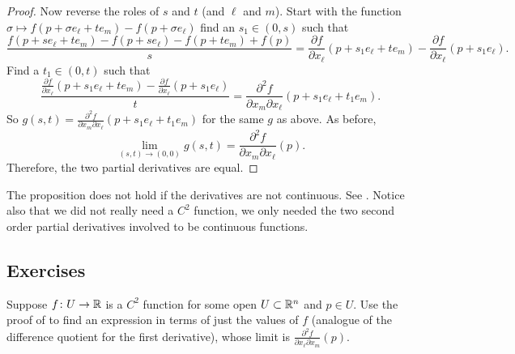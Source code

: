 \begin{proof}
Now reverse the roles of $s$ and $t$ (and $\ell$ and $m$).  Start with
the function $\sigma \mapsto f(p+\sigma e_{\ell} + te_m)-f(p + \sigma
e_{\ell})$
find an $s_1 \in (0,s)$ such that
\begin{equation*}
\frac{f(p+ se_{\ell} + te_m )- f(p+s e_{\ell}) - f(p+t e_m)+f(p)}{s}
=
\frac{\partial f}{\partial x_{\ell}}(p + s_1 e_{\ell} + t e_m)
-
\frac{\partial f}{\partial x_{\ell}}(p + s_1 e_{\ell}) .
\end{equation*}
Find a $t_1 \in (0,t)$ such that
\begin{equation*}
\frac{\frac{\partial f}{\partial x_{\ell}}(p + s_1 e_{\ell} + t e_m)
-
\frac{\partial f}{\partial x_{\ell}}(p + s_1 e_{\ell})}{t}
=
\frac{\partial^2 f}{\partial x_m \partial x_{\ell}}(p + s_1 e_{\ell} + t_1 e_m) .
\end{equation*}
So $g(s,t) = \frac{\partial^2 f}{\partial x_m \partial
x_{\ell}}(p + s_1 e_{\ell} + t_1 e_m)$ for the same $g$ as above.
As before,
\begin{equation*}
\lim_{(s,t) \to (0,0)} g(s,t) = 
\frac{\partial^2 f}{\partial x_m \partial x_{\ell}}(p) .
\end{equation*}
Therefore, the two partial derivatives are equal.
\end{proof}

The proposition does not hold if the derivatives are not
continuous.  See .
Notice also that we did not really need a $C^2$ function, we only needed the
two second order partial derivatives involved to be continuous functions.

\subsection{Exercises}

\begin{exercise}
Suppose $f \colon U \to {\mathbb{R}}$ is a $C^2$ function for some open $U \subset
{\mathbb{R}}^n$ and $p \in U$.
Use the proof of  to find an expression
in terms of just the values of $f$ (analogue of the difference quotient
for the first derivative), whose limit is
$\frac{\partial^2 f}{ \partial x_{\ell} \partial x_m}(p)$.
\end{exercise}


